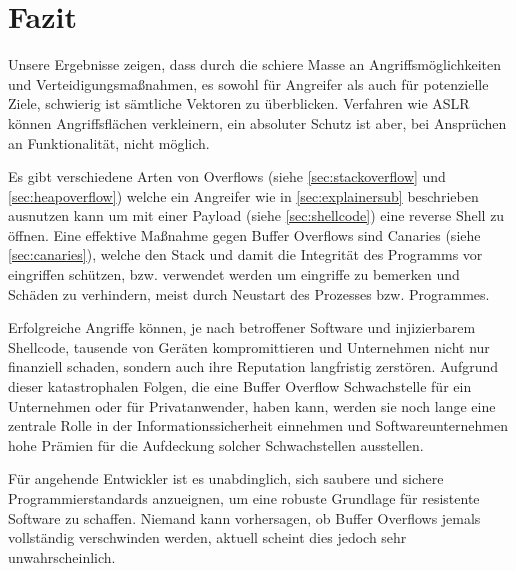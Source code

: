 \pagebreak

\section{Fazit}
Unsere Ergebnisse zeigen, dass durch die schiere Masse an Angriffsmöglichkeiten und Verteidigungsmaßnahmen, 
es sowohl für Angreifer als auch für potenzielle Ziele, schwierig ist sämtliche Vektoren zu überblicken. 
Verfahren wie ASLR können Angriffsflächen verkleinern, ein absoluter Schutz ist aber, bei Ansprüchen an Funktionalität, nicht möglich.

Es gibt verschiedene Arten von Overflows (siehe \autoref{sec:stackoverflow} und \ref*{sec:heapoverflow})
welche ein Angreifer wie in \autoref{sec:explainersub} beschrieben ausnutzen kann um
mit einer Payload (siehe \autoref{sec:shellcode}) eine reverse Shell zu öffnen.
Eine effektive Maßnahme gegen Buffer Overflows sind Canaries (siehe \autoref{sec:canaries}),
welche den Stack und damit die Integrität des Programms vor eingriffen schützen, bzw.
verwendet werden um eingriffe zu bemerken und Schäden zu verhindern, meist durch Neustart
des Prozesses bzw. Programmes.

Erfolgreiche Angriffe können, je nach betroffener Software und injizierbarem Shellcode, tausende von Geräten kompromittieren und
Unternehmen nicht nur finanziell schaden, sondern auch ihre Reputation langfristig zerstören. 
Aufgrund dieser katastrophalen Folgen, die eine Buffer Overflow Schwachstelle für ein Unternehmen oder für Privatanwender, 
haben kann, werden sie noch lange eine zentrale Rolle in der Informationssicherheit einnehmen und 
Softwareunternehmen hohe Prämien für die Aufdeckung solcher Schwachstellen ausstellen. 

Für angehende Entwickler ist es unabdinglich, sich saubere und sichere Programmierstandards anzueignen, um eine robuste Grundlage für resistente Software zu schaffen. 
Niemand kann vorhersagen, ob Buffer Overflows jemals vollständig verschwinden werden, aktuell scheint dies jedoch sehr unwahrscheinlich.




















